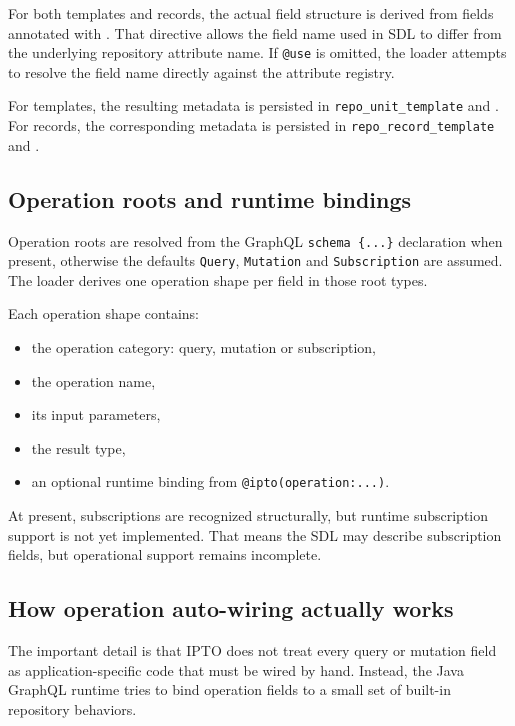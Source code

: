 For both templates and records, the actual field structure is derived from fields annotated with . That directive allows the field name used in SDL to differ from the underlying repository attribute name. If \texttt{@use} is omitted, the loader attempts to resolve the field name directly against the attribute registry.

For templates, the resulting metadata is persisted in \texttt{repo\_unit\_template} and . For records, the corresponding metadata is persisted in \texttt{repo\_record\_template} and .

\subsection{Operation roots and runtime bindings}

Operation roots are resolved from the GraphQL \texttt{schema \{...\}} declaration when present, otherwise the defaults \texttt{Query}, \texttt{Mutation} and \texttt{Subscription} are assumed. The loader derives one operation shape per field in those root types.

Each operation shape contains:
\begin{itemize}
\item the operation category: query, mutation or subscription,
\item the operation name,
\item its input parameters,
\item the result type,
\item an optional runtime binding from \texttt{@ipto(operation:...)}.
\end{itemize}

At present, subscriptions are recognized structurally, but runtime subscription support is not yet implemented. That means the SDL may describe subscription fields, but operational support remains incomplete.

\subsection{How operation auto-wiring actually works}

The important detail is that IPTO does not treat every query or mutation field as application-specific code that must be wired by hand. Instead, the Java GraphQL runtime tries to bind operation fields to a small set of built-in repository behaviors.

